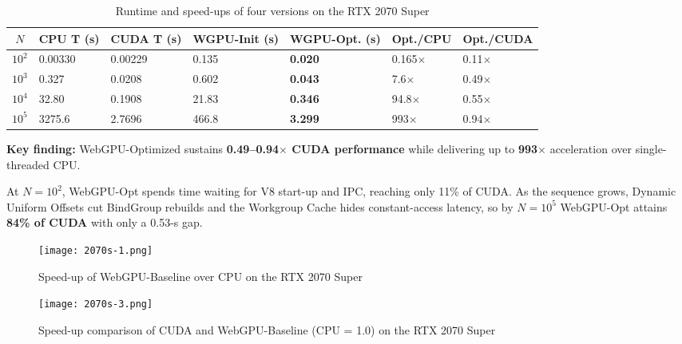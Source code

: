 \documentclass[PhD]{PHlab-thesis}
\begin{document}
\begin{table}[h]
    \centering
    \begin{tabularx}{\textwidth}{|c|X|X|X|X|X|X|}
        \hline
        \setlength{\tabcolsep}{4pt}         %
        \renewcommand{\arraystretch}{2}   %
        \small    
        $N$ & CPU T (s) & CUDA T (s) & WGPU-Init (s) & \textbf{WGPU-Opt. (s)} & Opt./CPU & Opt./CUDA \\
        \hline
        $10^2$ & 0.00330 & 0.00229 & 0.135 & \textbf{0.020} & 0.165$\times$ & 0.11$\times$ \\
        $10^3$ & 0.327 & 0.0208 & 0.602 & \textbf{0.043} & 7.6$\times$ & 0.49$\times$ \\
        $10^4$ & 32.80 & 0.1908 & 21.83 & \textbf{0.346} & 94.8$\times$ & 0.55$\times$ \\
        $10^5$ & 3275.6 & 2.7696 & 466.8 & \textbf{3.299} & 993$\times$ & 0.94$\times$ \\
        \hline
    \end{tabularx}
    \caption{Runtime and speed-ups of four versions on the RTX 2070 Super}
    \label{tab:rtx_performance}
\end{table}

\textbf{Key finding:} WebGPU-Optimized sustains \textbf{0.49–0.94$\times$ CUDA performance} while delivering up to \textbf{993$\times$} acceleration over single-threaded CPU.

At $N=10^2$, WebGPU-Opt spends time waiting for V8 start-up and IPC, reaching only 11\% of CUDA.
As the sequence grows, Dynamic Uniform Offsets cut BindGroup rebuilds and the Workgroup Cache hides constant-access latency, so by $N=10^5$ WebGPU-Opt attains \textbf{84\% of CUDA} with only a 0.53-s gap.

\begin{figure}[htbp]
    \centering
    \texttt{[image: 2070s-1.png]}
    \caption{Speed-up of WebGPU-Baseline over CPU on the RTX 2070 Super}
    \label{fig:2070s-wgpu-baseline}
\end{figure}

\begin{figure}[htbp]
    \centering
    \texttt{[image: 2070s-3.png]}
    \caption{Speed-up comparison of CUDA and WebGPU-Baseline (CPU = 1.0) on the RTX 2070 Super}
    \label{fig:2070s-cuda-vs-baseline}
\end{figure}
\end{document}
